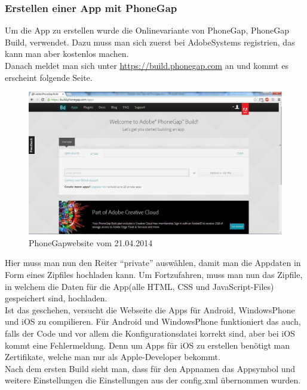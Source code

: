 \subsubsection{Erstellen einer App mit PhoneGap}
Um die App zu erstellen wurde die Onlinevariante von PhoneGap, PhoneGap Build, verwendet. Dazu muss man sich zuerst bei AdobeSystems registrien, das kann man aber kostenlos machen.\\
Danach meldet man sich unter \href{https://build.phonegap.com}{https://build.phonegap.com} an und kommt es erscheint folgende Seite.\\

\begin{figure}[H]
\includegraphics[keepaspectratio=true, width=14cm]{images/phoneGap/PhoneGap1.png}
\caption{PhoneGapwebsite vom 21.04.2014}
\end{figure}

Hier muss man nun den Reiter \enquote{private} auswählen, damit man die Appdaten in Form eines Zipfiles hochladen kann.
Um Fortzufahren, muss man nun das Zipfile, in welchem die Daten für die App(alle HTML, CSS und JavaScript-Files) gespeichert sind, hochladen.\\
Ist das geschehen, versucht die Webseite die Apps für Android, WindowsPhone und iOS zu compilieren. Für Android und WindowsPhone funktioniert das auch, falls der Code und vor allem die Konfigurationsdatei korrekt sind, aber bei iOS kommt eine Fehlermeldung. Denn um Apps für iOS zu erstellen benötigt man Zertifikate, welche man nur als Apple-Developer bekommt.\\
Nach dem ersten Build sieht man, dass für den Appnamen das Appsymbol und weitere Einstellungen die Einstellungen aus der config.xml übernommen wurden.\\

